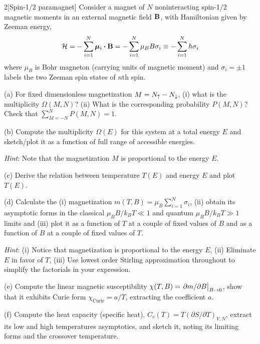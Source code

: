 \documentclass[12pt]{article}
\begin{document}
\begin{problem}{2}[Spin-1/2 paramagnet]
Consider a magnet of $N$ noninteracting spin-1/2 magnetic moments in an external
magnetic field $\vb{B}$, with Hamiltonian given by Zeeman energy,
\begin{equation}
    \HH=-\sum_{i=1}^N\bm\mu_i\vdot\vb{B}=-\sum_{i=1}^N\mu_BB\sigma_i
    \equiv-\sum_{i=1}^Nh\sigma_i
\end{equation}
where $\mu_B$ is Bohr magneton (carrying units of magnetic moment) and
$\sigma_i=\pm1$ labels the two Zeeman spin states of $n$th spin.

(a) For fixed dimensionless magnetization $M=N_\uparrow-N_\downarrow$, (i) what is the
multiplicity $\Omega(M,N)$? (ii) What is the corresponding probability $P(M,N)$?
Check that $\sum_{M=-N}^NP(M,N)=1$.

(b) Compute the multiplicity $\Omega(E)$ for this system at a total energy $E$
and sketch/plot it as a function of full range of accessible energies. 

\textit{Hint}: Note that the magnetization $M$ is proportional to the energy
$E$.

(c) Derive the relation between temperature $T(E)$ and energy $E$ and plot
$T(E)$.

(d) Calculate the (i) magnetization $m(T,B)=\mu_B\sum_{i=1}^N\sigma_i$, (ii)
obtain its asymptotic forms in the classical $\mu_BB/k_BT\ll 1$ and quantum
$\mu_BB/k_BT\gg 1$ limits and (iii) plot it as a function of $T$ at a couple of
fixed values of $B$ and as a function of $B$ at a couple of fixed values of $T$.

\textit{Hint}: (i) Notice that magnetization is proportional to the energy $E$,
(ii) Eliminate $E$ in favor of $T$, (iii) Use lowest order Stirling
approximation throughout to simplify the factorials in your expression.

(e) Compute the linear magnetic susceptibility $\chi(T,B)=\eval{\partial
m/\partial B}_{B\to0}$, show that it exhibits Curie form
$\chi_\text{Curie}=a/T$, extracting the coefficient $a$.

(f) Compute the heat capacity (specific heat), $C_v(T)=T(\partial S/\partial
T)_{V,N}$, extract its low and high temperatures asymptotics, and sketch it,
noting its limiting forms and the crossover temperature.
\begin{solution}


\end{solution}
\end{problem}
\end{document}
